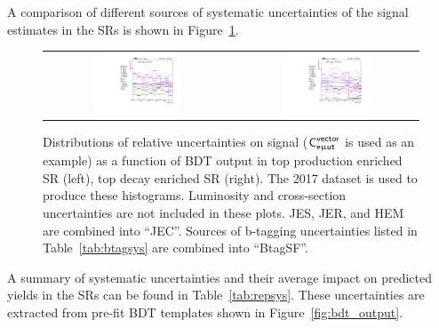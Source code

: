 A comparison of different sources of systematic uncertainties of the signal estimates in the \acp{SR} is shown in Figure~\ref{fig:Comp_sys_signal}.

\begin{figure}[tbh!]
 \begin{center}
 \begin{tabular}{cc}
 \includegraphics[width=0.48\textwidth]{figures/Part3/Systematics/sysBDT_ST_sig_2017}&
 \includegraphics[width=0.48\textwidth]{figures/Part3/Systematics/sysBDT_TT_sig_2017} \\
 \end{tabular}
 \caption{Distributions of relative uncertainties on signal ($\textsf{C}^{\textsf{vector}}_{\textsf{e}\upmu\textsf{{u}t}}$ is used as an example) as a function of \ac{BDT} output in top production enriched \ac{SR} (left), top decay enriched \ac{SR} (right). The 2017 dataset is used to produce these histograms. Luminosity and cross-section uncertainties are not included in these plots. \ac{JES}, \ac{JER}, and HEM are combined into ``JEC''. Sources of b-tagging uncertainties listed in Table~\ref{tab:btagsys} are combined into ``BtagSF''.}
 \label{fig:Comp_sys_signal}
 \end{center}
\end{figure}

A summary of systematic uncertainties and their average impact on predicted yields in the \acp{SR} can be found in Table~\ref{tab:repsys}. These uncertainties are extracted from pre-fit \ac{BDT} templates shown in Figure~\ref{fig:bdt_output}.

